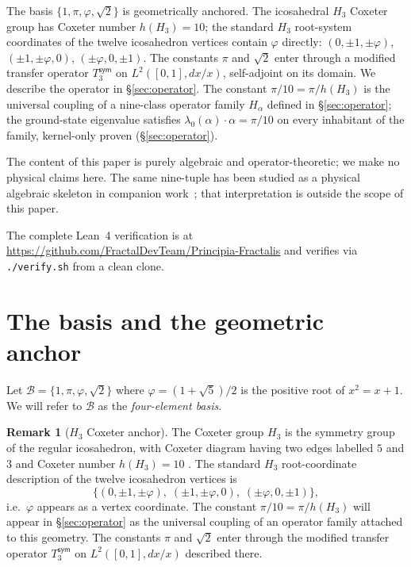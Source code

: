 \documentclass[11pt,a4paper]{amsart}
\theoremstyle{plain}
\theoremstyle{definition}
\newtheorem{remark}[theorem]{Remark}
\begin{document}
The basis $\{1, \pi, \varphi, \sqrt{2}\}$ is geometrically anchored. The icosahedral $H_3$ Coxeter group has Coxeter number $h(H_3) = 10$; the standard $H_3$ root-system coordinates of the twelve icosahedron vertices contain $\varphi$ directly: $(0, \pm 1, \pm \varphi)$, $(\pm 1, \pm \varphi, 0)$, $(\pm \varphi, 0, \pm 1)$. The constants $\pi$ and $\sqrt{2}$ enter through a modified transfer operator $T_3^{\textsf{sym}}$ on $L^2([0,1], dx/x)$, self-adjoint on its domain. We describe the operator in \S\ref{sec:operator}. The constant $\pi/10 = \pi/h(H_3)$ is the universal coupling of a nine-class operator family $H_\alpha$ defined in \S\ref{sec:operator}; the ground-state eigenvalue satisfies $\lambda_0(\alpha)\cdot\alpha = \pi/10$ on every inhabitant of the family, kernel-only proven (\S\ref{sec:operator}).

The content of this paper is purely algebraic and operator-theoretic; we make no physical claims here. The same nine-tuple has been studied as a physical algebraic skeleton in companion work~\cite{cohen2026book}; that interpretation is outside the scope of this paper.

The complete Lean~4 verification is at \url{https://github.com/FractalDevTeam/Principia-Fractalis} and verifies via \verb|./verify.sh| from a clean clone.

\section{The basis and the geometric anchor}\label{sec:basis}

Let $\mathcal{B} = \{1, \pi, \varphi, \sqrt{2}\}$ where $\varphi = (1+\sqrt{5})/2$ is the positive root of $x^2 = x + 1$. We will refer to $\mathcal{B}$ as the \emph{four-element basis}.

\begin{remark}[$H_3$ Coxeter anchor]
The Coxeter group $H_3$ is the symmetry group of the regular icosahedron, with Coxeter diagram having two edges labelled $5$ and $3$ and Coxeter number $h(H_3) = 10$ \cite{bourbaki1968}. The standard $H_3$ root-coordinate description of the twelve icosahedron vertices is
\[
\{(0, \pm 1, \pm \varphi),\;(\pm 1, \pm \varphi, 0),\;(\pm \varphi, 0, \pm 1)\},
\]
i.e.\ $\varphi$ appears as a vertex coordinate. The constant $\pi/10 = \pi/h(H_3)$ will appear in \S\ref{sec:operator} as the universal coupling of an operator family attached to this geometry. The constants $\pi$ and $\sqrt{2}$ enter through the modified transfer operator $T_3^{\textsf{sym}}$ on $L^2([0,1], dx/x)$ described there.
\end{remark}
\end{document}
